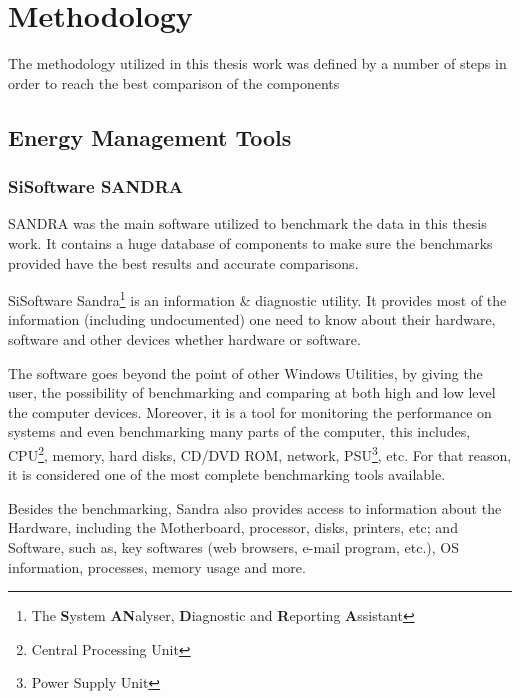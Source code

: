 

\chapter{Methodology} \label{chap3:methodology}
    The methodology utilized in this thesis work was defined by a number of steps in order to reach the best comparison of the components

\section{Energy Management Tools} \label{sec3:energy_management_tools}
\subsection{SiSoftware SANDRA} \label{subsec3:sandra}
    SANDRA was the main software utilized to benchmark the data in this thesis work. It contains a huge database of components to make sure the benchmarks provided have the best results and accurate comparisons.
    
    SiSoftware Sandra\footnote{The \textbf{S}ystem \textbf{AN}alyser, \textbf{D}iagnostic and \textbf{R}eporting \textbf{A}ssistant} is an information \& diagnostic utility. It provides most of the information (including undocumented) one need to know about their hardware, software and other devices whether hardware or software.
    
    The software goes beyond the point of other Windows Utilities, by giving the user, the possibility of benchmarking and comparing at both high and low level the computer devices. Moreover, it is a tool for monitoring the performance on systems and even benchmarking many parts of the computer, this includes, CPU\footnote{Central Processing Unit}, memory, hard disks, CD/DVD ROM, network, PSU\footnote{Power Supply Unit}, etc. For that reason, it is considered one of the most complete benchmarking tools available.
    
    Besides the benchmarking, Sandra also provides access to information about the Hardware, including the Motherboard, processor, disks, printers, etc; and Software, such as, key softwares (web browsers, e-mail program, etc.), OS information, processes, memory usage and more.
    
